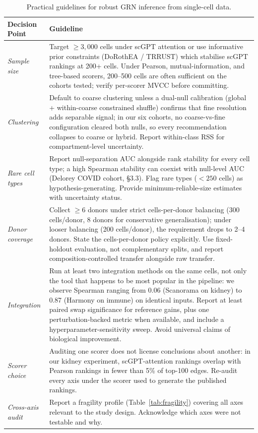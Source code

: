 \documentclass[12pt]{article}
\begin{document}
\begin{table}[ht]
\centering
\caption{Practical guidelines for robust GRN inference from single-cell data.}
\label{tab:guidelines}
\small
\begin{tabularx}{\textwidth}{lX}
\toprule
\textbf{Decision Point} & \textbf{Guideline} \\
\midrule
\textit{Sample size} &
  Target $\geq 3{,}000$ cells under scGPT attention or use informative
  prior constraints (DoRothEA / TRRUST) which stabilise scGPT rankings
  at 200+ cells. Under Pearson, mutual-information, and tree-based
  scorers, 200--500 cells are often sufficient on the cohorts tested;
  verify per-scorer MVCC before committing. \\
\addlinespace
\textit{Clustering} &
  Default to coarse clustering unless a dual-null calibration (global +
  within-coarse constrained shuffle) confirms that fine resolution
  adds separable signal; in our six cohorts, no coarse-vs-fine
  configuration cleared both nulls, so every recommendation collapses
  to coarse or hybrid. Report within-class RSS for compartment-level
  uncertainty. \\
\addlinespace
\textit{Rare cell types} &
  Report null-separation AUC alongside rank stability for every cell
  type; a high Spearman stability can coexist with null-level AUC
  (Delorey COVID cohort, §3.3). Flag rare types ($< 250$ cells) as
  hypothesis-generating. Provide minimum-reliable-size estimates with
  uncertainty status. \\
\addlinespace
\textit{Donor coverage} &
  Collect $\geq 6$ donors under strict cells-per-donor balancing
  (300 cells/donor, 8 donors for conservative generalisation); under
  looser balancing (200 cells/donor), the requirement drops to 2--4
  donors. State the cells-per-donor policy explicitly. Use
  fixed-holdout evaluation, not complementary splits, and report
  composition-controlled transfer alongside raw transfer. \\
\addlinespace
\textit{Integration} &
  Run at least two integration methods on the same cells, not only the
  tool that happens to be most popular in the pipeline: we observe
  Spearman ranging from 0.06 (Scanorama on kidney) to 0.87 (Harmony
  on immune) on identical inputs. Report at least paired swap
  significance for reference gains, plus one perturbation-backed
  metric when available, and include a hyperparameter-sensitivity
  sweep. Avoid universal claims of biological improvement. \\
\addlinespace
\textit{Scorer choice} &
  Auditing one scorer does not license conclusions about another: in
  our kidney experiment, scGPT-attention rankings overlap with Pearson
  rankings in fewer than 5\% of top-100 edges. Re-audit every axis
  under the scorer used to generate the published rankings. \\
\addlinespace
\textit{Cross-axis audit} &
  Report a fragility profile (Table~\ref{tab:fragility}) covering all
  axes relevant to the study design. Acknowledge which axes were not
  testable and why. \\
\bottomrule
\end{tabularx}
\end{table}
\end{document}
